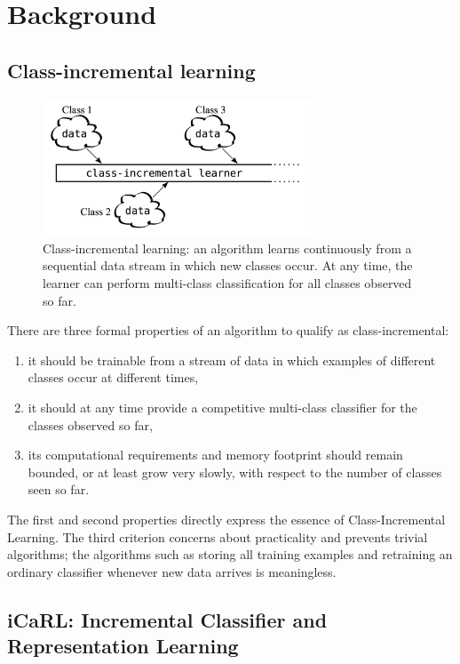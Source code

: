 
\section{Background}
\label{sec:background}

\subsection{Class-incremental learning}
\label{sec:cil}

\begin{figure}[h]
\includegraphics[width=80mm]{data/class-incremental_learning.png}
\centering
\caption{Class-incremental learning: an algorithm learns continuously from a sequential data stream in which new classes occur. At any time, the learner can perform multi-class classification for all classes observed so far. \label{fig:class-incremental_learning}}
\end{figure}

There are three formal properties of an algorithm to qualify as class-incremental:
\begin{enumerate}
\item it should be trainable from a stream of data in which examples of different classes occur at different times,
\item it should at any time provide a competitive multi-class classifier for the classes observed so far,
\item its computational requirements and memory footprint should remain bounded, or at least grow very slowly, with respect to the number of classes seen so far.
\end{enumerate}
The first and second properties directly express the essence of Class-Incremental Learning. The third criterion concerns about practicality and prevents trivial algorithms; the algorithms such as storing all training examples and retraining an ordinary classifier whenever new data arrives is meaningless.


\subsection{iCaRL: Incremental Classifier and Representation Learning}
\label{sec:icarl}

